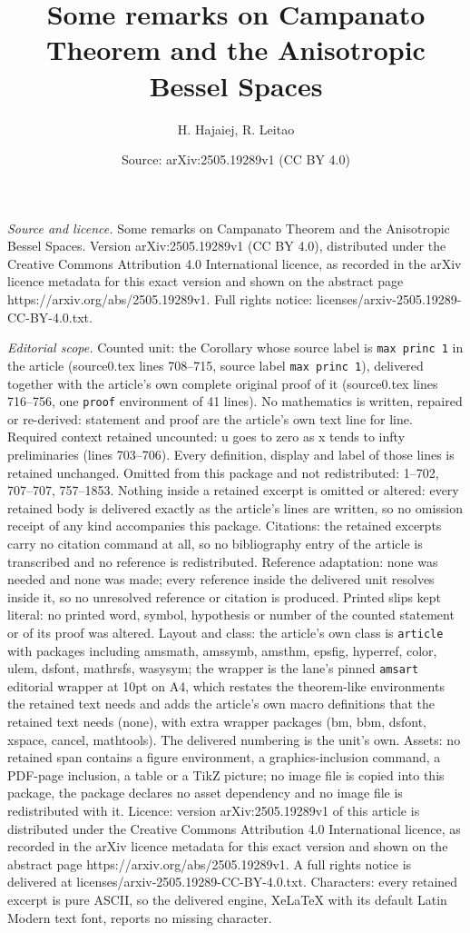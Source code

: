 \documentclass[10pt,a4paper]{amsart}
\title[Some remarks on Campanato Theorem and the Anisotropic Bessel]{Some remarks on Campanato Theorem and the Anisotropic Bessel Spaces}
\author{H. Hajaiej, R. Leitao}
\date{Source: arXiv:2505.19289v1 (CC BY 4.0)}
\begin{document}
\maketitle

\noindent\emph{Source and licence.} Some remarks on Campanato Theorem and the Anisotropic Bessel Spaces. Version arXiv:2505.19289v1 (CC BY 4.0), distributed under the Creative Commons Attribution 4.0 International licence, as recorded in the arXiv licence metadata for this exact version and shown on the abstract page https://arxiv.org/abs/2505.19289v1. Full rights notice: licenses/arxiv-2505.19289-CC-BY-4.0.txt.\par\smallskip

\noindent\textit{Editorial scope.} Counted unit: the Corollary whose source label is \texttt{max princ 1} in the article (source0.tex lines 708--715, source label \texttt{max princ 1}), delivered together with the article's own complete original proof of it (source0.tex lines 716--756, one \texttt{proof} environment of 41 lines). No mathematics is written, repaired or re-derived: statement and proof are the article's own text line for line. Required context retained uncounted: u goes to zero as x tends to infty preliminaries (lines 703--706). Every definition, display and label of those lines is retained unchanged. Omitted from this package and not redistributed: 1--702, 707--707, 757--1853. Nothing inside a retained excerpt is omitted or altered: every retained body is delivered exactly as the article's lines are written, so no omission receipt of any kind accompanies this package. Citations: the retained excerpts carry no citation command at all, so no bibliography entry of the article is transcribed and no reference is redistributed. Reference adaptation: none was needed and none was made; every reference inside the delivered unit resolves inside it, so no unresolved reference or citation is produced. Printed slips kept literal: no printed word, symbol, hypothesis or number of the counted statement or of its proof was altered. Layout and class: the article's own class is \texttt{article} with packages including amsmath, amssymb, amsthm, epsfig, hyperref, color, ulem, dsfont, mathrsfs, wasysym; the wrapper is the lane's pinned \texttt{amsart} editorial wrapper at 10pt on A4, which restates the theorem-like environments the retained text needs and adds the article's own macro definitions that the retained text needs (none), with extra wrapper packages (bm, bbm, dsfont, xspace, cancel, mathtools). The delivered numbering is the unit's own. Assets: no retained span contains a figure environment, a graphics-inclusion command, a PDF-page inclusion, a table or a TikZ picture; no image file is copied into this package, the package declares no asset dependency and no image file is redistributed with it. Licence: version arXiv:2505.19289v1 of this article is distributed under the Creative Commons Attribution 4.0 International licence, as recorded in the arXiv licence metadata for this exact version and shown on the abstract page https://arxiv.org/abs/2505.19289v1. A full rights notice is delivered at licenses/arxiv-2505.19289-CC-BY-4.0.txt. Characters: every retained excerpt is pure ASCII, so the delivered engine, XeLaTeX with its default Latin Modern text font, reports no missing character.
\end{document}
